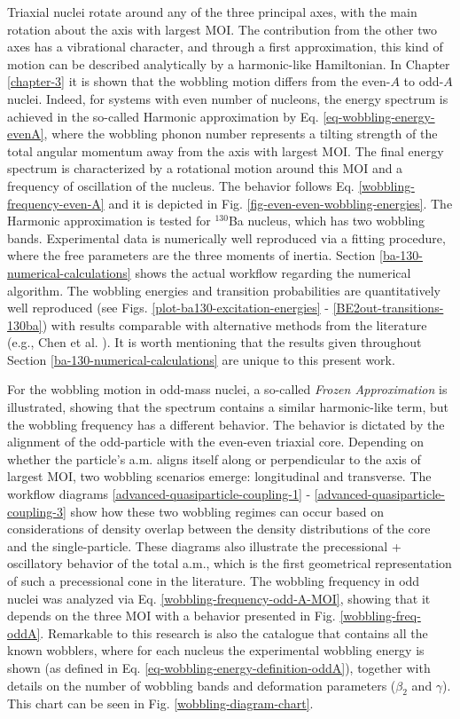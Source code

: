 Triaxial nuclei rotate around any of the three principal axes, with the main rotation about the axis with largest MOI. The contribution from the other two axes has a vibrational character, and through a first approximation, this kind of motion can be described analytically by a harmonic-like Hamiltonian. In Chapter \ref{chapter-3} it is shown that the wobbling motion differs from the even-$A$ to odd-$A$ nuclei. Indeed, for systems with even number of nucleons, the energy spectrum is achieved in the so-called Harmonic approximation by Eq. \ref{eq-wobbling-energy-evenA}, where the wobbling phonon number represents a tilting strength of the total angular momentum away from the axis with largest MOI. The final energy spectrum is characterized by a rotational motion around this MOI and a frequency of oscillation of the nucleus. The behavior follows Eq. \ref{wobbling-frequency-even-A} and it is depicted in Fig. \ref{fig-even-even-wobbling-energies}. The Harmonic approximation is tested for $^{130}$Ba nucleus, which has two wobbling bands. Experimental data is numerically well reproduced via a fitting procedure, where the free parameters are the three moments of inertia. Section \ref{ba-130-numerical-calculations} shows the actual workflow regarding the numerical algorithm. The wobbling energies and transition probabilities are quantitatively well reproduced (see Figs. \ref{plot-ba130-excitation-energies} - \ref{BE2out-transitions-130ba}) with results comparable with alternative methods from the literature (e.g., Chen et al. \cite{chen2019transverse}). It is worth mentioning that the results given throughout Section \ref{ba-130-numerical-calculations} are unique to this present work. 

For the wobbling motion in odd-mass nuclei, a so-called \emph{Frozen Approximation} is illustrated, showing that the spectrum contains a similar harmonic-like term, but the wobbling frequency has a different behavior. The behavior is dictated by the alignment of the odd-particle with the even-even triaxial core. Depending on whether the particle's a.m. aligns itself along or perpendicular to the axis of largest MOI, two wobbling scenarios emerge: longitudinal and transverse. The workflow diagrams \ref{advanced-quasiparticle-coupling-1} - \ref{advanced-quasiparticle-coupling-3} show how these two wobbling regimes can occur based on considerations of density overlap between the density distributions of the core and the single-particle. These diagrams also illustrate the precessional + oscillatory behavior of the total a.m., which is the first geometrical representation of such a precessional cone in the literature. The wobbling frequency in odd nuclei was analyzed via Eq. \ref{wobbling-frequency-odd-A-MOI}, showing that it depends on the three MOI with a behavior presented in Fig. \ref{wobbling-freq-oddA}. Remarkable to this research is also the catalogue that contains all the known wobblers, where for each nucleus the experimental wobbling energy is shown (as defined in Eq. \ref{eq-wobbling-energy-definition-oddA}), together with details on the number of wobbling bands and deformation parameters ($\beta_2$ and $\gamma$). This chart can be seen in Fig. \ref{wobbling-diagram-chart}.

